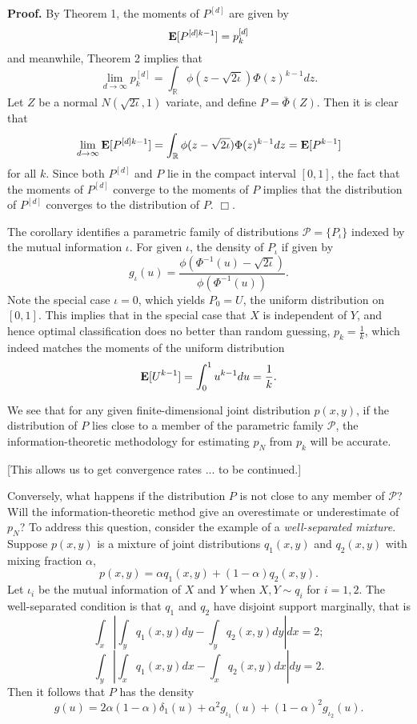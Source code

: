 \documentclass[12pt]{article}
\begin{document}
\noindent\textbf{Proof.} By Theorem 1, the moments of $P^{[d]}$ are given by
\[
\textbf{E}[P^{[d]k-1}] = p_k^{[d]}
\]
and meanwhile, Theorem 2 implies that
\[
\lim_{d \to \infty} p_k^{[d]} = \int_{\mathbb{R}} \phi(z - \sqrt{2\iota}) \Phi(z)^{k-1} dz.
\]
Let $Z$ be a normal $N(\sqrt{2\iota}, 1)$ variate,
and define $P = \bar{\Phi}(Z)$.
Then it is clear that
\[
\lim_{d \to \infty} \textbf{E}[P^{[d]k-1}] = \int_{\mathbb{R}} \phi(z - \sqrt{2\iota}) \Phi(z)^{k-1} dz = \textbf{E}[P^{k-1}]
\]
for all $k$.
Since both $P^{[d]}$ and $P$ lie in the compact interval $[0, 1]$,
the fact that the moments of $P^{[d]}$ converge to the moments of $P$ implies that the distribution of $P^[d]$
converges to the distribution of $P$. $\Box$.

The corollary identifies a parametric family of distributions $\mathcal{P} = \{P_\iota\}$ indexed by
the mutual information $\iota$.
For given $\iota$, the density of $P_\iota$ if given by
\[
g_\iota(u) = \frac{\phi(\Phi^{-1}(u) - \sqrt{2\iota})}{\phi(\Phi^{-1}(u))}.
\]
Note the special case $\iota = 0$, which yields $P_0 = U$, the uniform distribution on $[0,1]$.
This implies that in the special case that $X$ is independent of $Y$,
and hence optimal classification does no better than random guessing, $p_k = \frac{1}{k}$,
which indeed matches the moments of the uniform distribution
\[
\textbf{E}[U^{k-1}] = \int_0^1 u^{k-1} du = \frac{1}{k}.
\]

We see that for any given finite-dimensional joint distribution $p(x, y)$, if the distribution of $P$ lies close
to a member of the parametric family $\mathcal{P}$, the information-theoretic methodology for estimating
$p_N$ from $p_k$ will be accurate.

[This allows us to get convergence rates ... to be continued.]

Conversely, what happens if the distribution $P$ is not close to any member of $\mathcal{P}$?
Will the information-theoretic method give an overestimate or underestimate of $p_N$?
To address this question, consider the example of a \emph{well-separated mixture}.
Suppose $p(x,y)$ is a mixture of joint distributions $q_1(x,y)$ and $q_2(x,y)$ with mixing fraction $\alpha$,
\[
p(x, y) = \alpha q_1(x, y) + (1-\alpha) q_2(x, y).
\]
Let $\iota_i$ be the mutual information of $X$ and $Y$ when $X, Y \sim q_i$
for $i = 1,2$.
The well-separated condition is that $q_1$ and $q_2$ have disjoint support marginally, that is
\[
\int_x \left| \int_y q_1(x, y) dy - \int_y q_2(x, y) dy\right| dx = 2;
\]
\[
\int_y \left| \int_x q_1(x, y) dx - \int_x q_2(x, y) dx\right| dy = 2.
\]
Then it follows that $P$ has the density
\[
g(u) = 2\alpha(1-\alpha)\delta_1(u) + \alpha^2 g_{\iota_1}(u) + (1-\alpha)^2 g_{\iota_2}(u).
\]
\end{document}
